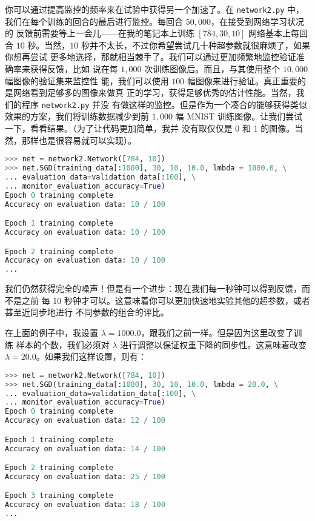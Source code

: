 你可以通过提高监控的频率来在试验中获得另一个加速了。在 \lstinline!network2.py!
中，我们在每个训练的回合的最后进行监控。每回合 $50,000$，在接受到网络学习状况的
反馈前需要等上一会儿——在我的笔记本上训练 $[784, 30, 10]$ 网络基本上每回合 $10$
秒。当然，$10$ 秒并不太长，不过你希望尝试几十种超参数就很麻烦了，如果你想再尝试
更多地选择，那就相当棘手了。我们可以通过更加频繁地监控验证准确率来获得反馈，比如
说在每 $1,000$ 次训练图像后。而且，与其使用整个 $10,000$ 幅图像的验证集来监控性
能，我们可以使用 $100$ 幅图像来进行验证。真正重要的是网络看到足够多的图像来做真
正的学习，获得足够优秀的估计性能。当然，我们的程序 \lstinline!network2.py! 并没
有做这样的监控。但是作为一个凑合的能够获得类似效果的方案，我们将训练数据减少到前
$1,000$ 幅 MNIST 训练图像。让我们尝试一下，看看结果。（为了让代码更加简单，我并
  没有取仅仅是 0 和 1 的图像。当然，那样也是很容易就可以实现）。
\begin{lstlisting}[language=Python]
>>> net = network2.Network([784, 10])
>>> net.SGD(training_data[:1000], 30, 10, 10.0, lmbda = 1000.0, \
... evaluation_data=validation_data[:100], \
... monitor_evaluation_accuracy=True)
Epoch 0 training complete
Accuracy on evaluation data: 10 / 100

Epoch 1 training complete
Accuracy on evaluation data: 10 / 100

Epoch 2 training complete
Accuracy on evaluation data: 10 / 100
...
\end{lstlisting}

我们仍然获得完全的噪声！但是有一个进步：现在我们每一秒钟可以得到反馈，而不是之前
每 10 秒钟才可以。这意味着你可以更加快速地实验其他的超参数，或者甚至近同步地进行
不同参数的组合的评比。

在上面的例子中，我设置 $\lambda=1000.0$，跟我们之前一样。但是因为这里改变了训练
样本的个数，我们必须对 $\lambda$ 进行调整以保证权重下降的同步性。这意味着改变
$\lambda = 20.0$。如果我们这样设置，则有：

\begin{lstlisting}[language=Python]
>>> net = network2.Network([784, 10])
>>> net.SGD(training_data[:1000], 30, 10, 10.0, lmbda = 20.0, \
... evaluation_data=validation_data[:100], \
... monitor_evaluation_accuracy=True)
Epoch 0 training complete
Accuracy on evaluation data: 12 / 100

Epoch 1 training complete
Accuracy on evaluation data: 14 / 100

Epoch 2 training complete
Accuracy on evaluation data: 25 / 100

Epoch 3 training complete
Accuracy on evaluation data: 18 / 100
...
\end{lstlisting}

